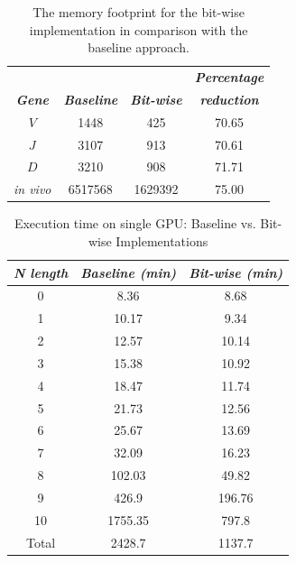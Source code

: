 \begin{table}[t!]
\caption{The memory footprint for the bit-wise implementation in comparison with the baseline approach.}

\renewcommand{\arraystretch}{1.2}
\begin{center}
\begin{tabular}{ |c|c|c|c| }
  \hline
    \textbf{\textit{}}  & \textbf{\textit{}}  & \textbf{\textit{}} & \textbf{\textit{Percentage}}\\	
    \textbf{\textit{Gene}} & \textbf{\textit{Baseline \cite{b2}}}& \textbf{\textit{Bit-wise}}& \textbf{\textit{ reduction}}\\ \hline
    $V$ & 1448 & 425  & 70.65 \\	\hline
    $J$& 3107 & 913  & 70.61\\ 	\hline
    $D$& 3210  & 908  & 71.71\\	\hline
    \emph{in vivo}& 6517568  & 1629392  & 75.00 \\	 
  \hline
\end{tabular}
  \label{tab:bit-wise-mem}
\end{center}

\end{table}

\begin{table}[t!]
\caption{Execution time on single GPU: Baseline vs. Bit-wise Implementations }

\renewcommand{\arraystretch}{1.2}
\begin{center}
\begin{tabular}{ |c|c|c| }
  \hline
   \textbf{\textit{ \emph{N} length }} & \textbf{\textit{Baseline (min)}} & \textbf{\textit{Bit-wise (min)}} \\	\hline
    0 & 8.36 & 8.68 \\	\hline
    1 & 10.17 & 9.34 \\ 	\hline
    2 & 12.57 & 10.14\\	\hline
    3 & 15.38 & 10.92 \\	\hline
    4 & 18.47 & 11.74\\	\hline
    5 & 21.73 & 12.56\\ 	\hline
    6 & 25.67 & 13.69\\	\hline
    7 & 32.09 & 16.23\\	\hline
    8 & 102.03 & 49.82\\	\hline
    9 & 426.9 & 196.76\\		\hline
    10 & 1755.35 & 797.8\\	\hline
    Total & 2428.7 & 1137.7 \\
  \hline
\end{tabular}
  \label{tab:bit-wise-time}
\end{center}
\end{table}

